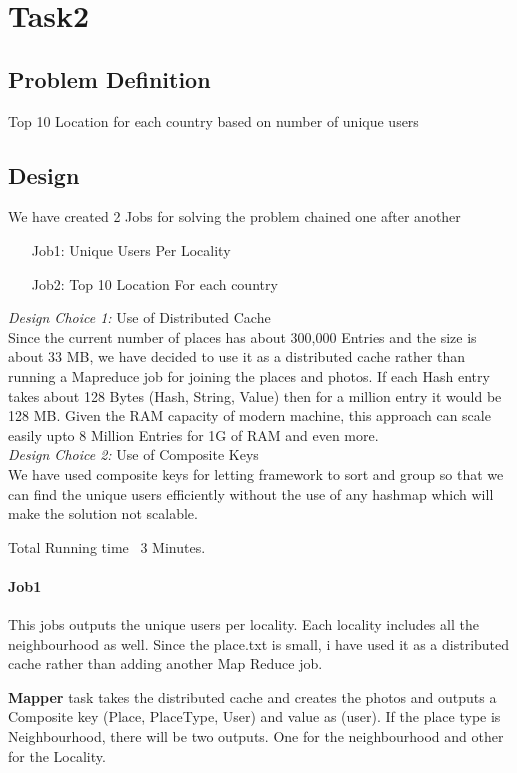 \chapter{Task2}

\section{Problem Definition}
	Top 10 Location for each country based on number of unique users 
	
\section{Design}
	We have created 2 Jobs for solving the problem chained one after another\\
	\begin{itemize}
		\item [Job1:] Unique Users Per Locality  
		\item [Job2:] Top 10 Location For each country
	\end{itemize}

	
	\emph{Design Choice 1:}  Use of Distributed Cache \\
		Since the current number of places has about 300,000 Entries and the size is about 33 MB, we have decided to use it as a distributed cache rather than running a Mapreduce job for joining the places and photos. If each Hash entry takes about 128 Bytes (Hash, String, Value) then for a million entry it would be 128 MB. Given the RAM capacity of modern machine, this approach can scale easily upto 8 Million Entries for 1G of RAM and even more. \\
	\emph{Design Choice 2:} Use of Composite Keys \\
		We have used composite keys for letting framework to sort and group so that we can find the unique users efficiently without the use of any hashmap which will make the solution not scalable. 
		
		Total Running time ~3 Minutes. \\
\subsubsection{Job1}
	This jobs outputs the unique users per locality. Each locality includes all the neighbourhood as well. Since the place.txt is small, i have used it as a distributed cache rather than adding another Map Reduce job.
	
	\textbf{Mapper} task takes the distributed cache and creates the photos and outputs a Composite key (Place, PlaceType, User) and value as (user). If the place type is Neighbourhood, there will be two outputs. One for the neighbourhood and other for the Locality. 
	
